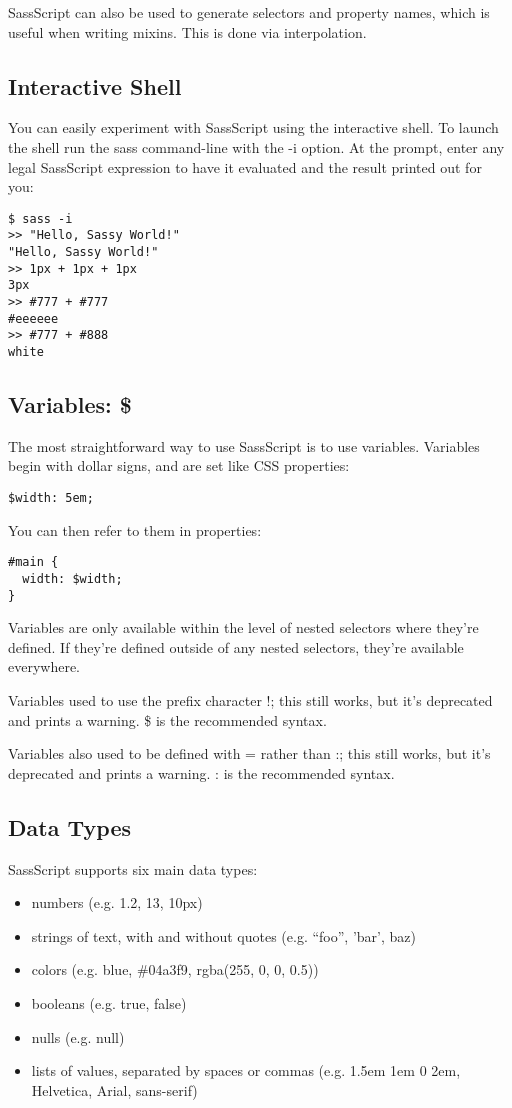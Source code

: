 \documentclass[10pt]{article}
\begin{document}
 SassScript can also be used to generate selectors and property names, which is useful when writing mixins. This is done via interpolation.
\subsection{Interactive Shell}


 You can easily experiment with SassScript using the interactive shell. To launch the shell run the sass command-line with the -i option. At the prompt, enter any legal SassScript expression to have it evaluated and the result printed out for you:
\begin{verbatim}
$ sass -i
>> "Hello, Sassy World!"
"Hello, Sassy World!"
>> 1px + 1px + 1px
3px
>> #777 + #777
#eeeeee
>> #777 + #888
white
\end{verbatim}
\subsection{Variables: \$}


 The most straightforward way to use SassScript is to use variables. Variables begin with dollar signs, and are set like CSS properties:
\begin{verbatim}
$width: 5em;
\end{verbatim}


 You can then refer to them in properties:
\begin{verbatim}
#main {
  width: $width;
}
\end{verbatim}


 Variables are only available within the level of nested selectors where they’re defined. If they’re defined outside of any nested selectors, they’re available everywhere.


 Variables used to use the prefix character !; this still works, but it’s deprecated and prints a warning. \$ is the recommended syntax.


 Variables also used to be defined with = rather than :; this still works, but it’s deprecated and prints a warning. : is the recommended syntax.
\subsection{Data Types}


 SassScript supports six main data types:
\begin{itemize}
\item numbers (e.g. 1.2, 13, 10px)
\item strings of text, with and without quotes (e.g. ``foo'', 'bar', baz)
\item colors (e.g. blue, \#04a3f9, rgba(255, 0, 0, 0.5))
\item booleans (e.g. true, false)
\item nulls (e.g. null)
\item lists of values, separated by spaces or commas (e.g. 1.5em 1em 0 2em, Helvetica, Arial, sans-serif)

\end{itemize}
\end{document}

